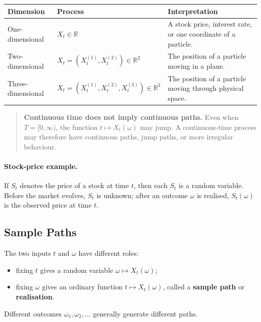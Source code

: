 \documentclass[12pt,openany]{book}
\theoremstyle{definition}
\theoremstyle{remark}
\begin{document}
\begin{center}
\begin{tabular}{L{0.19\textwidth}L{0.28\textwidth}L{0.43\textwidth}}
\toprule
\textbf{Dimension} & \textbf{Process} & \textbf{Interpretation} \\
\midrule
One-dimensional & \(X_t\in\mathbb{R}\) & A stock price, interest rate, or
one coordinate of a particle. \\
Two-dimensional & \(X_t=(X_t^{(1)},X_t^{(2)})\in\mathbb{R}^2\) & The
position of a particle moving in a plane. \\
Three-dimensional & \(X_t=(X_t^{(1)},X_t^{(2)},X_t^{(3)})\in\mathbb{R}^3\)
& The position of a particle moving through physical space. \\
\bottomrule
\end{tabular}
\end{center}

\begin{quote}
\colorbox{diagramBlue!8}{%
\parbox{\dimexpr\linewidth-2\fboxsep\relax}{%
\textbf{Continuous time does not imply continuous paths.} Even when
\(T=[0,\infty)\), the function \(t\mapsto X_t(\omega)\) may jump. A
continuous-time process may therefore have continuous paths, jump paths, or
more irregular behaviour.}}
\end{quote}

\paragraph{Stock-price example.}
If \(S_t\) denotes the price of a stock at time \(t\), then each \(S_t\) is a
random variable. Before the market evolves, \(S_t\) is unknown; after an
outcome \(\omega\) is realised, \(S_t(\omega)\) is the observed price at time
\(t\).

\subsection{Sample Paths}

The two inputs \(t\) and \(\omega\) have different roles:
\begin{itemize}
    \item fixing \(t\) gives a random variable \(\omega\mapsto X_t(\omega)\);
    \item fixing \(\omega\) gives an ordinary function
    \(t\mapsto X_t(\omega)\), called a \textbf{sample path} or
    \textbf{realisation}.
\end{itemize}
Different outcomes \(\omega_1,\omega_2,\ldots\) generally generate different
paths.
\end{document}
